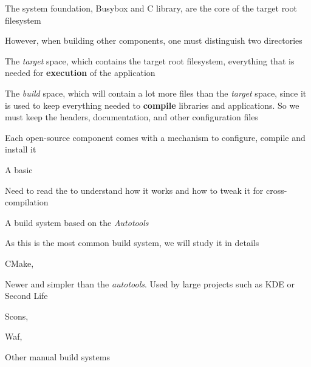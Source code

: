  \startitemize
  \item The system foundation, Busybox and C library, are the core of
    the target root filesystem
  \item However, when building other components, one must distinguish
    two directories
    \startitemize
    \item The {\em target} space, which contains the target root
      filesystem, everything that is needed for {\bf execution} of the
      application
    \item The {\em build} space, which will contain a lot more files
      than the {\em target} space, since it is used to keep everything
      needed to {\bf compile} libraries and applications. So we must
      keep the headers, documentation, and other configuration files
    \stopitemize
  \stopitemize

  \startitemize
  \item Each open-source component comes with a mechanism to
    configure, compile and install it
    \startitemize
    \item A basic 
      \startitemize
      \item Need to read the  to understand how it
        works and how to tweak it for cross-compilation
      \stopitemize
    \item A build system based on the {\em Autotools}
      \startitemize
      \item As this is the most common build system, we will study it
        in details
      \stopitemize
    \item CMake, 
      \startitemize
      \item Newer and simpler than the {\em autotools}. Used by large
        projects such as KDE or Second Life
      \stopitemize
    \item Scons, 
    \item Waf, 
    \item Other manual build systems
    \stopitemize
  \stopitemize

